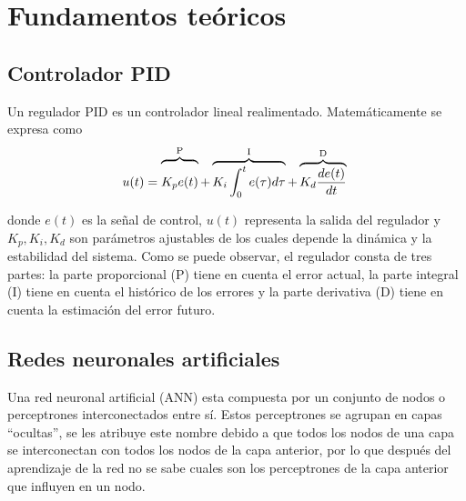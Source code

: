 \chapter{Fundamentos teóricos}







\section{Controlador PID}




Un regulador PID es un controlador lineal realimentado. Matemáticamente se expresa como 
\begin{equation}
	u(t) = \overbrace{\raisebox{0ex}[2.2\height]{$K_p e(t)$}}^\text{P} +\overbrace{K_i \int_{0}^{t}e(\tau)d\tau}^\text{I} + \overbrace{ K_d \frac{de(t)}{dt}}^\text{D}\;
\end{equation}




donde $e(t)$ es la señal de control, $u(t)$ representa la salida del regulador y $K_p,K_i,K_d$ son parámetros ajustables de los cuales depende la dinámica y la estabilidad del sistema. Como se puede observar, el regulador consta de tres partes: la parte proporcional (P) tiene en cuenta el error actual, la parte integral (I) tiene en cuenta el histórico de los errores y la parte derivativa (D) tiene en cuenta la estimación del error futuro.
\section{Redes neuronales artificiales} 
 Una red neuronal artificial (ANN) esta compuesta por un conjunto de nodos o perceptrones interconectados entre sí. Estos perceptrones se agrupan en capas ``ocultas'', se les atribuye este nombre debido a que todos los nodos de una capa se interconectan con todos los nodos de la capa anterior, por lo que después del aprendizaje de la red no se sabe cuales son los perceptrones de la capa anterior que influyen en un nodo.
 
